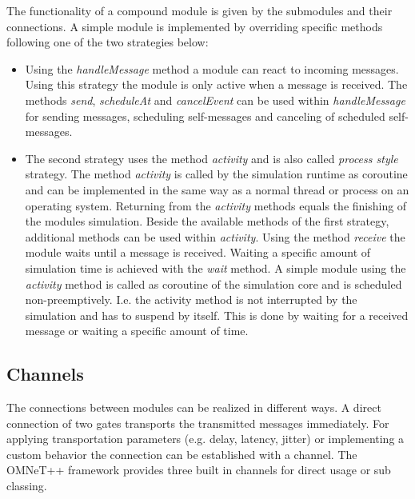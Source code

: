 The functionality of a compound module is given by the submodules and their connections.
A simple module is implemented by overriding specific methods following one of the two strategies below:

\begin{itemize}
    \item Using the \emph{handleMessage} method a module can react to incoming messages.
    Using this strategy the module is only active when a message is received.
    The methods \emph{send}, \emph{scheduleAt} and \emph{cancelEvent} can be used within \emph{handleMessage} for sending messages, scheduling self-messages and canceling of scheduled self-messages. \cite[section 4.4.1]{omnet_manual}
    
    \item The second strategy uses the method \emph{activity} and is also called \emph{process style} strategy.
    The method \emph{activity} is called by the simulation runtime as coroutine and can be implemented in the same way as a normal thread or process on an operating system.
    Returning from the \emph{activity} methods equals the finishing of the modules simulation.
    Beside the available methods of the first strategy, additional methods can be used within \emph{activity}.
    Using the method \emph{receive} the module waits until a message is received.
    Waiting a specific amount of simulation time is achieved with the \emph{wait} method.
    A simple module using the \emph{activity} method is called as coroutine of the simulation core and is scheduled non-preemptively.
    I.e. the activity method is not interrupted by the simulation and has to suspend by itself.
    This is done by waiting for a received message or waiting a specific amount of time. \cite[section 4.4.2]{omnet_manual}
\end{itemize}

\subsection{Channels}
\label{sec:omnet_components_channels}
The connections between modules can be realized in different ways.
A direct connection of two gates transports the transmitted messages immediately.
For applying transportation parameters (e.g. delay, latency, jitter) or implementing a custom behavior the connection can be established with a channel.
The OMNeT++ framework provides three built in channels for direct usage or sub classing.

